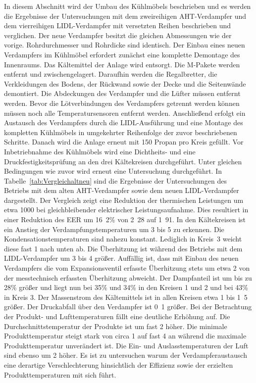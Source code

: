 In diesem Abschnitt wird der Umbau des Kühlmöbels beschrieben und es werden die Ergebnisse der Untersuchungen mit dem zweireihigen AHT-Verdampfer und dem vierreihigen LIDL-Verdampfer mit versetzten Reihen beschrieben und verglichen. Der neue Verdampfer besitzt die gleichen Abmessungen wie der vorige. Rohrdurchmesser und Rohrdicke sind identisch. Der Einbau eines neuen Verdampfers im Kühlmöbel erfordert zunächst eine komplette Demontage des Innenraums. Das Kältemittel der Anlage wird entsorgt. Die M-Pakete werden entfernt und zwischengelagert. Daraufhin werden die Regalbretter, die Verkleidungen des Bodens, der Rückwand sowie der Decke und die Seitenwände demontiert. Die Abdeckungen des Verdampfer und die Lüfter müssen entfernt werden. Bevor die Lötverbindungen des Verdampfers getrennt werden können müssen noch alle Temperatursensoren entfernt werden. Anschließend erfolgt ein Austausch des Verdampfers durch die LIDL-Ausführung und eine Montage des kompletten Kühlmöbels in umgekehrter Reihenfolge der zuvor beschriebenen Schritte. Danach wird die Anlage erneut mit \unit{150}{\gram} Propan pro Kreis gefüllt. Vor Inbetriebnahme des Kühlmöbels wird eine Dichtheits- und eine Druckfestigkeitsprüfung an den drei Kältekreisen durchgeführt. Unter gleichen Bedingungen wie zuvor wird erneut eine Untersuchung durchgeführt. \newline In Tabelle~\ref{tab:Vergleichaltneu} sind die Ergebnisse der Untersuchungen des Betriebs mit dem alten AHT-Verdampfer sowie dem neuen LIDL-Verdampfer dargestellt.
Der Vergleich zeigt eine Reduktion der thermischen Leistungen um etwa \unit{1000}{\watt} bei gleichbleibender elektrischer Leistungsaufnahme. Dies resultiert in einer Reduktion des EER um \unit{16.2}{\%} von \unit{2.28}{} auf \unit{1.91}{}. In den Kältekreisen ist ein Anstieg der Verdampfungstemperaturen um \unit{3}{\kelvin} bis \unit{5}{\kelvin} zu erkennen. Die Kondensationstemperaturen sind nahezu konstant. Lediglich in Kreis~3 weicht diese fast \unit{1}{\kelvin} nach unten ab. Die Überhitzung ist während des Betriebs mit dem LIDL-Verdampfer um \unit{3}{\kelvin} bis \unit{4}{\kelvin} größer. Auffällig ist, dass mit Einbau des neuen Verdampfers die vom Expansionsventil erfasste Überhitzung stets um etwa \unit{2}{\kelvin} von der messtechnisch erfassten Überhitzung abweicht. Der Dampfanteil ist um bis zu \unit{28}{\%} größer und liegt nun bei \unit{35}{\%} und \unit{34}{\%} in den Kreisen 1 und 2 und bei \unit{43}{\%} in Kreis 3. Der Massenstrom des Kältemittels ist in allen Kreisen etwa \unit{1}{\gram} bis \unit{1.5}{\gram} größer. Der Druckabfall über den Verdampfer ist \unit{0.1}{\bbar} größer. 
Bei der Betrachtung der Produkt- und Lufttemperaturen fällt eine deutliche Erhöhung auf.
Die Durchschnittstemperatur der Produkte ist um fast \unit{2}{\kelvin} höher. Die minimale Produkttemperatur steigt stark von circa \unit{1}{\celsius} auf fast \unit{4}{\celsius} an während die maximale Produkttemperatur unverändert ist. Die Ein- und Auslasstemperaturen der Luft sind ebenso um \unit{2}{\kelvin} höher. \newline
Es ist zu untersuchen warum der Verdampferaustausch eine derartige Verschlechterung hinsichtlich der Effizienz sowie der erzielten Produkttemperaturen mit sich führt.




